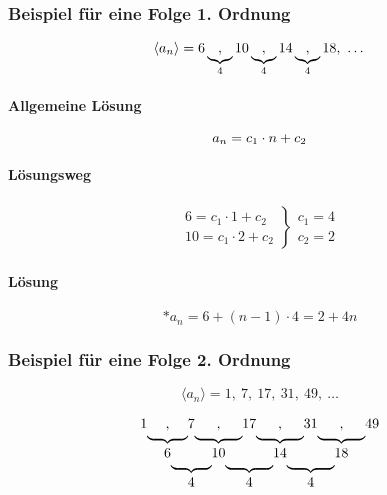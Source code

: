 \subsubsection{Beispiel für eine Folge 1. Ordnung}

\[
	\langle a_n \rangle = 6 \underbrace{,}_{4} 10 \underbrace{,}_{4} 14 \underbrace{,}_{4} 18,\ \ldots \\
\]

\paragraph{Allgemeine Lösung}

\[
	a_n = c_1 \cdot n + c_2 \\
\]

\paragraph{Lösungsweg}

\begin{align*}
	\left.
		\begin{array}{l}
			6 = c_1 \cdot 1 + c_2 \\
			10 = c_1 \cdot 2 + c_2
		\end{array}
	\right \}
	\left.
		\begin{array}{l}
			c_1 = 4 \\
			c_2 = 2
		\end{array}
	\right.
\end{align*}

\paragraph{Lösung}

\[
	*a_n = 6 + (n - 1) \cdot 4 = 2 + 4 n
\]

\subsubsection{Beispiel für eine Folge 2. Ordnung}

\[
	\langle a_n \rangle = 1,\ 7,\ 17,\ 31,\ 49,\ \ldots 
\]

\[
	\begin{tabular}{ccccccccccccc}
		1&,&7&,&17&,&31&,&49\\[-3pt]
		& \ubf&&\ubf&&\ubf&&\ubf \\
		& 6&&10&&14&&18\\[-3pt]
		&  &\ubf&&\ubf&&\ubf \\
		&  &4&&4&&4
  	\end{tabular}
\]

